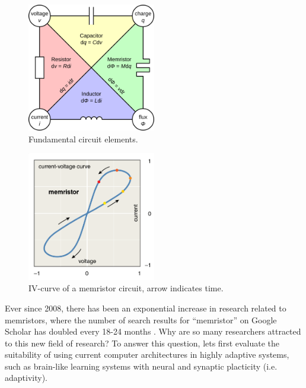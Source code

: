 \begin{figure}[htbp]
	\begin{center}
		\includegraphics[width=0.5\textwidth]{inc/circuit_elements.png}
		\caption{Fundamental circuit elements.\protect\footnotemark}
		\label{fig:circuit_elements}
	\end{center}
\end{figure}

\begin{figure}[htbp]
	\begin{center}
		\includegraphics[width=0.5\textwidth]{inc/pinched_hysteresis.png}
		\caption{IV-curve of a memristor circuit, arrow indicates time.\protect\footnotemark}
		\label{fig:pinched_hysteresis}
	\end{center}
\end{figure}

Ever since 2008, there has been an exponential increase in research related to memristors, where the number of search results for ``memristor'' on Google Scholar has doubled every 18-24 months \cite{memristors_a_new_frontier}. Why are so many researchers attracted to this new field of research? To answer this question, lets first evaluate the suitability of using current computer architectures in highly adaptive systems, such as brain-like learning systems with neural and synaptic placticity (i.e. adaptivity).

